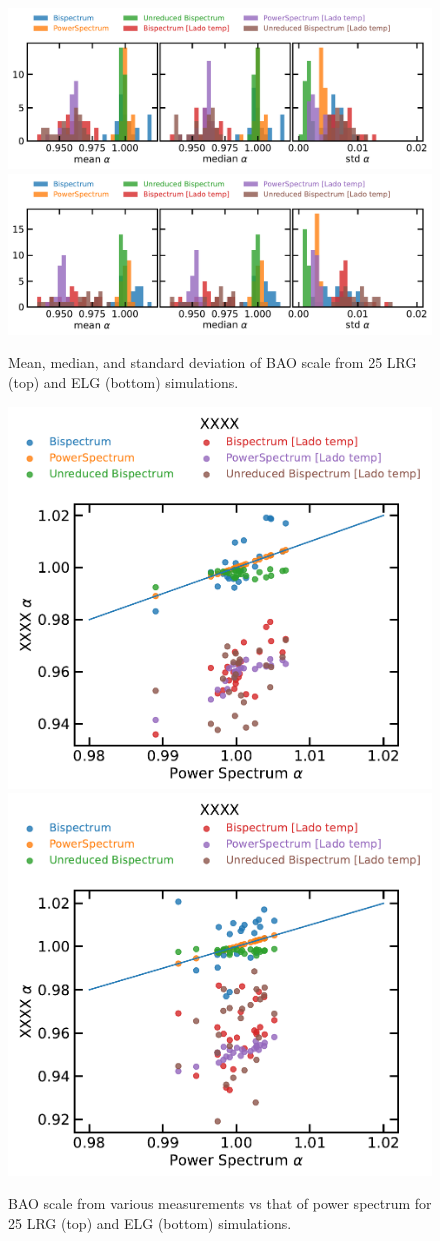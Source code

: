 \begin{figure}
    \centering
    \includegraphics[width=\textwidth]{figures/constraints_LRGz0.pdf}
    \includegraphics[width=\textwidth]{figures/constraints_ELGz1.pdf}
    \caption{Mean, median, and standard deviation of BAO scale from 25 LRG (top) and ELG (bottom) simulations.}
    \label{fig:constraints}
\end{figure}


\begin{figure}
    \centering
    \includegraphics[width=0.45 \textwidth]{figures/constraints_scatter_LRGz0.pdf}
    \includegraphics[width=0.45 \textwidth]{figures/constraints_scatter_ELGz1.pdf}
    \caption{BAO scale from various measurements vs that of power spectrum for 25 LRG (top) and ELG (bottom) simulations.}
    \label{fig:scatter_cons}
\end{figure}